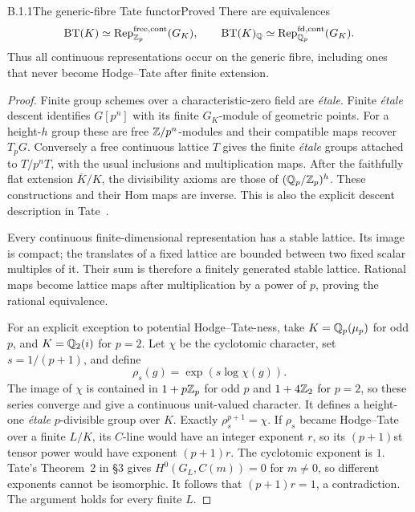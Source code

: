 \begin{result}{B.1.1}{The generic-fibre Tate functor}{Proved}
There are equivalences
\[
 \operatorname{BT}(K)\simeq
       \operatorname{Rep}_{\mathbb Z_p}^{\mathrm{free,cont}}(G_K),\qquad
 \operatorname{BT}(K)_{\mathbb Q}\simeq
       \operatorname{Rep}_{\mathbb Q_p}^{\mathrm{fd,cont}}(G_K).
\]
Thus all continuous representations occur on the generic fibre,
including ones that never become Hodge--Tate after finite extension.
\end{result}
\begin{proof}
Finite group schemes over a characteristic-zero field are \emph{\'etale}.
Finite \emph{\'etale} descent identifies $G[p^n]$ with its finite
$G_K$-module of geometric points. For a height-$h$ group these are
free $\mathbb Z/p^n$-modules and their compatible maps recover $T_pG$.
Conversely a free continuous lattice $T$ gives the finite \emph{\'etale}
groups attached to $T/p^nT$, with the usual inclusions and
multiplication maps. After the faithfully flat extension
$\overline K/K$, the divisibility axioms are those of
$(\mathbb Q_p/\mathbb Z_p)^h$. These constructions and their Hom maps are
inverse. This is also the explicit descent description in
Tate~\cite[\S1.4 and \S2.1]{Tate1967}.

Every continuous finite-dimensional representation has a stable
lattice. Its image is compact; the translates of a fixed lattice
are bounded between two fixed scalar multiples of it. Their sum
is therefore a finitely generated stable lattice. Rational maps
become lattice maps after multiplication by a power of $p$, proving
the rational equivalence.

For an explicit exception to potential Hodge--Tate-ness, take
$K=\mathbb Q_p(\mu_p)$ for odd $p$, and $K=\mathbb Q_2(i)$ for $p=2$.
Let $\chi$ be the cyclotomic character, set $s=1/(p+1)$, and define
\[
                  \rho_s(g)=\exp(s\log\chi(g)).
\]
The image of $\chi$ is contained in $1+p\mathbb Z_p$ for odd $p$ and
$1+4\mathbb Z_2$ for $p=2$, so these series converge and give a continuous
unit-valued character. It defines a height-one \emph{\'etale}
$p$-divisible group over $K$. Exactly $\rho_s^{p+1}=\chi$.
If $\rho_s$ became Hodge--Tate over a finite $L/K$, its $C$-line
would have an integer exponent $r$, so its $(p+1)$st tensor power
would have exponent $(p+1)r$. The cyclotomic exponent is $1$.
Tate's Theorem~2 in \S3 gives $H^0(G_L,C(m))=0$ for $m\ne0$,
so different exponents cannot be isomorphic. It follows that
$(p+1)r=1$, a contradiction. The argument holds for every finite
$L$.
\end{proof}

